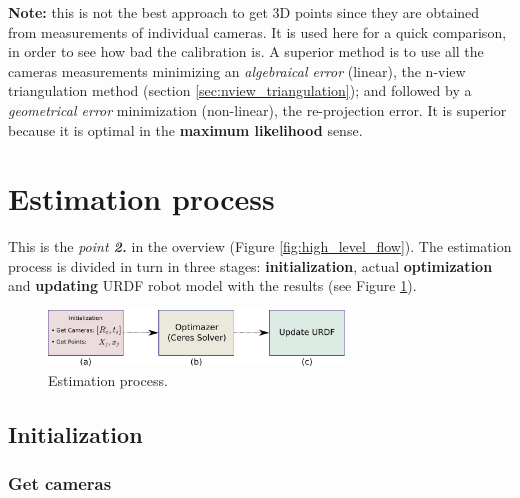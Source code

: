 \noindent
\textbf{Note:} this is not the best approach to get 3D points since they are obtained from measurements of individual cameras. It is used here for a quick comparison, in order to see how bad the calibration is. A superior method is to use all the cameras measurements minimizing an \textit{algebraical error} (linear), the n-view triangulation method (section \ref{sec:nview_triangulation}); and followed by a \textit{geometrical error} minimization (non-linear), the re-projection error. It is superior because it is optimal in the \textbf{maximum likelihood} sense.

\section{Estimation process}
\label{sec:estimation}

This is the \textit{point \textbf{2.}} in the overview (Figure \ref{fig:high_level_flow}).
The estimation process is divided in turn in three stages: \textbf{initialization}, actual \textbf{optimization} and \textbf{updating} URDF robot model with the results (see Figure \ref{fig:optimization}).

\begin{figure}[!htbp]
 \centering
 \includegraphics[width=0.7\textwidth]{images/optimization.pdf}
 \caption{Estimation process.}
 \label{fig:optimization}
\end{figure}

%


\subsection{Initialization}

\subsubsection*{Get cameras}

